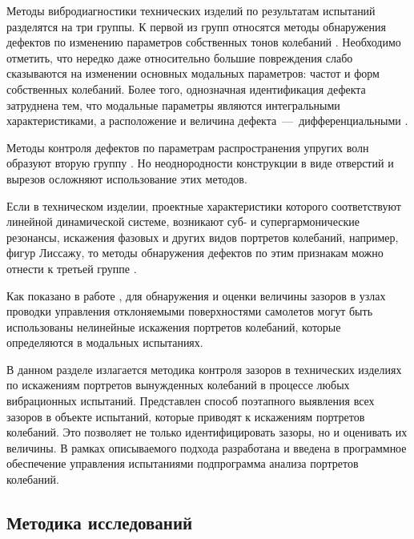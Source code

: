 Методы вибродиагностики технических изделий по результатам испытаний разделятся на три группы. К первой из групп относятся методы обнаружения дефектов по изменению параметров собственных тонов колебаний \cite{lib:defects:Kisilev, lib:defects:Postnov, lib:defects:Kosicyn, lib:defects:Perera, lib:defects:Dilena, lib:defects:Xu, lib:defects:Barbieri}. Необходимо отметить, что нередко даже относительно большие повреждения слабо сказываются на изменении основных модальных параметров: частот и форм собственных колебаний. Более того, однозначная идентификация дефекта затруднена тем, что модальные параметры являются интегральными характеристиками, а расположение и величина дефекта~---~дифференциальными \cite{lib:defects:Doebling}.

Методы контроля дефектов по параметрам распространения упругих волн образуют вторую группу \cite{lib:defects:Viktorov, lib:defects:Worlton:ultrasonic, lib:defects:Worlton:experimental, lib:defects:Kessler, lib:defects:Zaitsev}. Но неоднородности конструкции в виде отверстий и вырезов осложняют использование этих методов.

Если в техническом изделии, проектные характеристики которого соответствуют линейной динамической системе, возникают суб- и супергармонические резонансы, искажения фазовых и других видов портретов колебаний, например, фигур Лиссажу, то методы обнаружения дефектов по этим признакам можно отнести к третьей группе \cite{lib:defects:Bovsunovsky, lib:defects:Tsifanskiy, lib:defects:Diana, lib:defects:Berns:align, lib:defects:Berns:backlash, lib:defects:AlKhazali, lib:defects:Berns:gap, lib:defects:Berns:experience, lib:defects:Berns:cracks}.

Как показано в работе \cite{lib:defects:Berns:experience}, для обнаружения и оценки величины зазоров в узлах проводки управления отклоняемыми поверхностями самолетов могут быть использованы нелинейные искажения портретов колебаний, которые определяются в модальных испытаниях.

В данном разделе излагается методика контроля зазоров в технических изделиях по искажениям портретов вынужденных колебаний в процессе любых вибрационных испытаний. Представлен способ поэтапного выявления всех зазоров в объекте испытаний, которые приводят к искажениям портретов колебаний. Это позволяет не только идентифицировать зазоры, но и оценивать их величины. В рамках описываемого подхода разработана и введена в программное обеспечение управления испытаниями подпрограмма анализа портретов колебаний. 

\subsection{Методика исследований}

